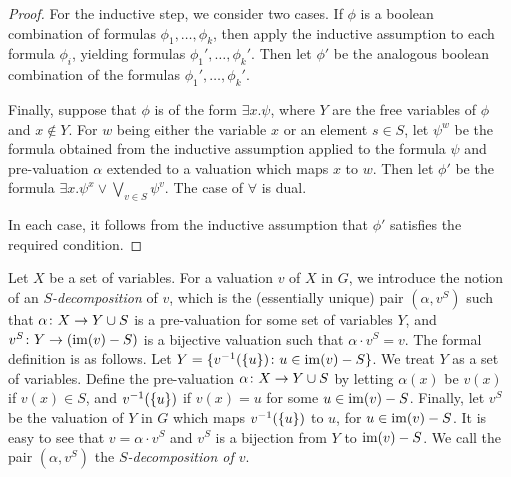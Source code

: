 \begin{proof}
For the inductive step, we consider two cases.
If $\phi$ is a boolean combination of formulas $\phi_1,\ldots,\phi_k$, then 
apply the inductive assumption to each formula $\phi_i$,
yielding formulas $\phi_1',\ldots,\phi_k'$. Then let $\phi'$ be the analogous boolean combination of the formulas $\phi_1',\ldots,\phi_k'$.

Finally, suppose that $\phi$ is of the form $\exists x.\psi$, where   $Y$ are the free variables of $\phi$ and $x\not \in Y$.
 For $w$ being either the variable $x$ 
or an element $s\in S$, 
let $\psi^w$ be the formula obtained from the inductive assumption applied to the formula $\psi$ 
and pre-valuation $\alpha$ extended to a valuation which maps  $x$ to $w$. 
Then let $\phi'$
be the formula $\exists x.\psi^x \lor \bigvee_{v\in S}\psi^v$.
The case of $\forall$ is dual.

In each case, it follows from the inductive assumption that $\phi'$ 
satisfies the required condition.
\end{proof}



Let $X$ be a set of variables.
For a valuation  $v$ of $X$ in $G$, we introduce the notion of an \emph{$S$-decomposition} of $v$,  
which is the (essentially unique) pair $(\alpha,v^S)$
such that $\alpha\colon X\to Y\cup S$ is a pre-valuation
for some set of variables $Y$,
and $v^S\colon Y\to (\mathrm{im}(v)-S)$ is a bijective valuation such that 
$\alpha\cdot v^S=v$. The formal definition is as follows.
Let $Y=\{v^{-1}(\{u\})\colon u\in \mathrm{im}(v)-S\}$. We treat $Y$ as a set of variables. 
Define the pre-valuation $\alpha\colon X\to Y\cup S$
by letting $\alpha(x)$ be $v(x)$ if $v(x)\in S$,
and $v^{-1}(\{u\})$ if $v(x)=u$ for some $u\in \mathrm{im}(v)-S$.
Finally, let $v^S$ be the valuation of $Y$ in $G$ which
maps  $v^{-1}(\{u\})$ to $u$, for $u\in \mathrm{im}(v)-S$.
It is easy to see that $v=\alpha\cdot v^S$ and $v^S$ is a bijection from $Y$ 
to $\mathrm{im}(v)-S$. We call the pair $(\alpha,v^S)$ the \emph{$S$-decomposition of $v$}.



